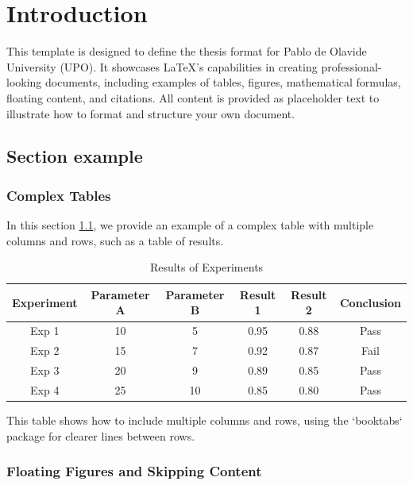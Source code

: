\setcounter{chapter}{0}
\chapter{Introduction} \label{chap::introduction}
This template is designed to define the thesis format for Pablo de Olavide University (\acs{UPO}). It showcases LaTeX’s capabilities in creating professional-looking documents, including examples of tables, figures, mathematical formulas, floating content, and citations. All content is provided as placeholder text to illustrate how to format and structure your own document.

\section{Section example} \label{sec::section_example}
\subsection{Complex Tables}

In this section \ref{sec::section_example}, we provide an example of a complex table with multiple columns and rows, such as a table of results.

\begin{table}[htbp]
    \centering
    \caption{Results of Experiments}
    \begin{tabular}{@{}cccccc@{}}
        \toprule
        \textbf{Experiment} & \textbf{Parameter A} & \textbf{Parameter B} & \textbf{Result 1} & \textbf{Result 2} & \textbf{Conclusion} \\ 
        \midrule
        Exp 1 & 10 & 5 & 0.95 & 0.88 & Pass \\
        Exp 2 & 15 & 7 & 0.92 & 0.87 & Fail \\
        Exp 3 & 20 & 9 & 0.89 & 0.85 & Pass \\
        Exp 4 & 25 & 10 & 0.85 & 0.80 & Pass \\
        \bottomrule
    \end{tabular}
\end{table}

This table shows how to include multiple columns and rows, using the `booktabs` package for clearer lines between rows.

\subsection{Floating Figures and Skipping Content}

